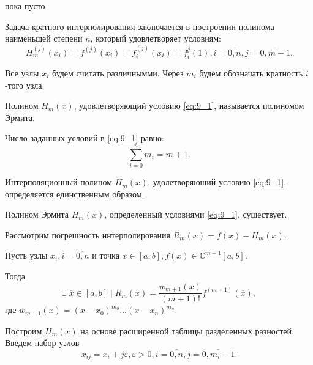 \begin{col-answer-preambule}
	\begin{plan}
    \item пока пусто
	\end{plan}
\end{col-answer-preambule}


Задача кратного интерполирования заключается в построении полинома наименьшей степени $n$, который удовлетворяет условиям:
\begin{equation}\label{eq:9_1}
  H_m^{(j)}(x_i) = f^{(j)}(x_i) = f_i^{(j)} (x_i) = f_i^{j}(1), i = \overline{0, n}, j = \overline{0, m - 1}.
\end{equation}

Все узлы $x_i$ будем считать различнымми. Через $m_i$ будем обозначать кратность $i$-того узла.

Полином $H_m(x)$, удовлетворяющий условию \eqref{eq:9_1}, называется полиномом Эрмита.

Число заданных условий в \eqref{eq:9_1} равно:
\begin{equation*}
  \sum\limits_{i=0}^n m_i = m + 1.
\end{equation*}

\begin{theorem}
  Интерполяционный полином $H_m(x)$, удолетворяющий условию \eqref{eq:9_1}, определяется единственным образом.
\end{theorem}

\begin{theorem}
  Полином Эрмита $H_m(x)$, определенный условиями \eqref{eq:9_1}, существует.
\end{theorem}

Рассмотрим погрешность интерполирования $R_m(x) = f(x) - H_m(x)$.

\begin{theorem}
  Пусть узлы $x_i, i = \overline{0, n}$ и точка $x \in [a, b], f(x) \in \mathbb{C}^{m + 1} [a, b]$.

  Тогда
  \begin{equation*}
    \exists \; \overline{x} \in [a, b] \; | \; R_m(x) = \dfrac{w_{m+1}(x)}{(m+1)!} f^{(m+1)}(\overline{x}),
  \end{equation*}
  где $w_{m+1}(x) = (x - x_0)^{m_0} \ldots (x - x_n)^{m_n}$.
\end{theorem}

Построим $H_m(x)$ на основе расширенной таблицы разделенных разностей. Введем набор узлов
\begin{equation*}
  x_{ij} = x_i + j \varepsilon, \varepsilon > 0, i = \overline{0, n}, j = \overline{0, m_i - 1}.
\end{equation*}

